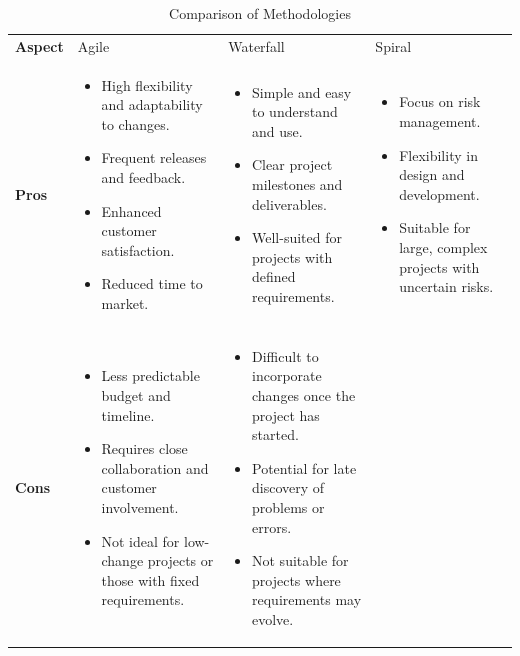 \begin{table}[H]
    \caption{Comparison of Methodologies}
    \centering
    \begin{tabularx}{\textwidth}{>{\bfseries}lXXX}
    \toprule
    Aspect & Agile & Waterfall & Spiral \\
    \addlinespace
    Pros & 
    \begin{itemize}[leftmargin=*, nosep, after=\strut]
        \item High flexibility and adaptability to changes.
        \item Frequent releases and feedback.
        \item Enhanced customer satisfaction.
        \item Reduced time to market.
    \end{itemize} & 
    \begin{itemize}[leftmargin=*, nosep, after=\strut]
        \item Simple and easy to understand and use.
        \item Clear project milestones and deliverables.
        \item Well-suited for projects with defined requirements.
    \end{itemize} & 
    \begin{itemize}[leftmargin=*, nosep, after=\strut]
        \item Focus on risk management.
        \item Flexibility in design and development.
        \item Suitable for large, complex projects with uncertain risks.
    \end{itemize} \\
    \addlinespace
    Cons & 
    \begin{itemize}[leftmargin=*, nosep, after=\strut]
        \item Less predictable budget and timeline.
        \item Requires close collaboration and customer involvement.
        \item Not ideal for low-change projects or those with fixed requirements.
    \end{itemize} & 
    \begin{itemize}[leftmargin=*, nosep, after=\strut]
        \item Difficult to incorporate changes once the project has started.
        \item Potential for late discovery of problems or errors.
        \item Not suitable for projects where requirements may evolve.

\end{itemize}
\end{tabularx}
\end{table}
